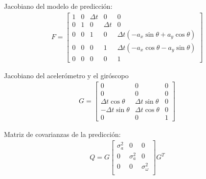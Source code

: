 Jacobiano del modelo de predicción:
\begin{align}
F = 
\begin{bmatrix} 
1 	&0	&\Delta t	&0		&0\\
0 	&1	&0		&\Delta t	&0\\
0 	&0	&1		&0		&\Delta t\left(-a_x\sin{\theta} + a_y\cos{\theta}\right) \\
0 	&0	&0		&1		&\Delta t\left(-a_x\cos{\theta} - a_y\sin{\theta}\right) \\
0 	&0	&0		&0		&1
\end{bmatrix}
\end{align}

Jacobiano del acelerómetro y el giróscopo
\begin{align}
G = 
\begin{bmatrix} 
0 			&0			&0\\
0 			&0			&0\\
\Delta t \cos{\theta} 	&\Delta t \sin{\theta}	&0\\
-\Delta t \sin{\theta} 	&\Delta t \cos{\theta}	&0\\
0 			&0			&1		
\end{bmatrix}
\end{align}

Matriz de covarianzas de la predicción:
\begin{align}
Q = 
G
\begin{bmatrix} 
\sigma^2_a 	& 0 		& 0\\
0 		& \sigma^2_a 	& 0\\
0 		& 0 		& \sigma^2_\omega\\
\end{bmatrix}
G^T
\end{align}


\endinput
